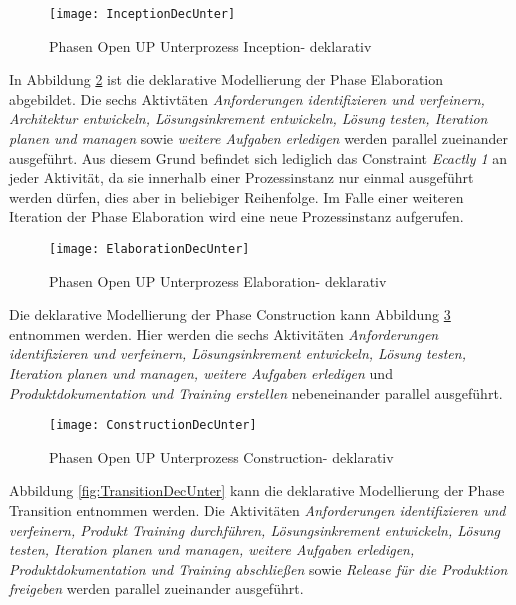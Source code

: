 \begin{figure}[htp]
\begin{center}
  \texttt{[image: InceptionDecUnter]} %
  \caption{Phasen Open UP Unterprozess Inception- deklarativ}
  \label{fig:InceptionDecUnter}
\end{center}
\end{figure}

In Abbildung \ref{fig:ElaborationDecUnter} ist die deklarative Modellierung der Phase Elaboration abgebildet. Die sechs Aktivtäten \textit{Anforderungen identifizieren und verfeinern, Architektur entwickeln, Lösungsinkrement entwickeln, Lösung testen, Iteration planen und managen} sowie \textit{weitere Aufgaben erledigen} werden parallel zueinander ausgeführt. Aus diesem Grund befindet sich lediglich das Constraint \textit{Ecactly 1} an jeder Aktivität, da sie innerhalb einer Prozessinstanz nur einmal ausgeführt werden dürfen, dies aber in beliebiger Reihenfolge. Im Falle einer weiteren Iteration der Phase Elaboration wird eine neue Prozessinstanz aufgerufen. \newline

\begin{figure}[htp]
\begin{center}
  \texttt{[image: ElaborationDecUnter]} %
  \caption{Phasen Open UP Unterprozess Elaboration- deklarativ} 
  \label{fig:ElaborationDecUnter}
\end{center}
\end{figure}

Die deklarative Modellierung der Phase Construction kann Abbildung \ref{fig:ConstructionDecUnter} entnommen werden. Hier werden die sechs Aktivitäten \textit{Anforderungen identifizieren und verfeinern, Lösungsinkrement entwickeln, Lösung testen, Iteration planen und managen, weitere Aufgaben erledigen} und \textit{Produktdokumentation und Training erstellen} nebeneinander parallel ausgeführt.
\begin{figure}[htp]
\begin{center}
  \texttt{[image: ConstructionDecUnter]} %
  \caption{Phasen Open UP Unterprozess Construction- deklarativ}
  \label{fig:ConstructionDecUnter}
\end{center}
\end{figure}

Abbildung \ref{fig:TransitionDecUnter} kann die deklarative Modellierung der Phase Transition entnommen werden.\newline
Die Aktivitäten \textit{Anforderungen identifizieren und verfeinern, Produkt Training durchführen, Lösungsinkrement entwickeln, Lösung testen, Iteration planen und managen, weitere Aufgaben erledigen, Produktdokumentation und Training abschließen} sowie \textit{Release für die Produktion freigeben} werden parallel zueinander ausgeführt.

